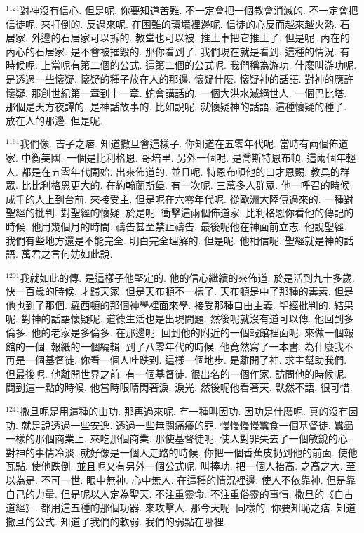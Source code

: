 \documentclass{book}
\begin{document}
$^{1121}$對神沒有信心.
但是呢.
你要知道苦難.
不一定會把一個教會消滅的.
不一定會把信徒呢.
來打倒的.
反過來呢.
在困難的環境裡邊呢.
信徒的心反而越來越火熱.
石居家.
外邊的石居家可以拆的.
教堂也可以被.
推土車把它推土了.
但是呢.
內在的內心的石居家.
是不會被摧毀的.
那你看到了.
我們現在就是看到.
這種的情況.
有時候呢.
上當呢有第二個的公式.
這第二個的公式呢.
我們稱為游功.
什麼叫游功呢.
是透過一些懷疑.
懷疑的種子放在人的那邊.
懷疑什麼.
懷疑神的話語.
對神的應許懷疑.
那創世紀第一章到十一章.
蛇會講話的.
一個大洪水滅絕世人.
一個巴比塔.
那個是天方夜譚的.
是神話故事的.
比如說呢.
就懷疑神的話語.
這種懷疑的種子.
放在人的那邊.
但是呢.

$^{1161}$我們像.
吉子之痞.
知道撒旦會這樣子.
你知道在五零年代呢.
當時有兩個佈道家.
中衡美國.
一個是比利格恩.
哥培里.
另外一個呢.
是喬斯特恩布頓.
這兩個年輕人.
都是在五零年代開始.
出來佈道的.
並且呢.
特恩布頓他的口才恩賜.
教具的群眾.
比比利格恩更大的.
在約翰蘭斯堡.
有一次呢.
三萬多人群眾.
他一呼召的時候.
成千的人上到台前.
來接受主.
但是呢在六零年代呢.
從歐洲大陸傳過來的.
一種對聖經的批判.
對聖經的懷疑.
於是呢.
衝擊這兩個佈道家.
比利格恩你看他的傳記的時候.
他用幾個月的時間.
禱告甚至禁止禱告.
最後呢他在神面前立志.
他說聖經.
我們有些地方還是不能完全.
明白完全理解的.
但是呢.
他相信呢.
聖經就是神的話語.
萬君之言何妨如此說.

$^{1201}$我就如此的傳.
是這樣子他堅定的.
他的信心繼續的來佈道.
於是活到九十多歲.
快一百歲的時候.
才歸天家.
但是天布頓不一樣了.
天布頓是中了那種的毒素.
但是他也到了那個.
羅西頓的那個神學裡面來學.
接受那種自由主義.
聖經批判的.
結果呢.
對神的話語懷疑呢.
道德生活也是出現問題.
然後呢就沒有道可以傳.
他回到多倫多.
他的老家是多倫多.
在那邊呢.
回到他的附近的一個報館裡面呢.
來做一個報館的一個.
報紙的一個編輯.
到了八零年代的時候.
他竟然寫了一本書.
為什麼我不再是一個基督徒.
你看一個人哇跌到.
這樣一個地步.
是離開了神.
求主幫助我們.
但最後呢.
他離開世界之前.
有一個基督徒.
很出名的一個作家.
訪問他的時候呢.
問到這一點的時候.
他當時眼睛閃著淚.
淚光.
然後呢他看著天.
默然不語.
很可惜.

$^{1241}$撒旦呢是用這種的由功.
那再過來呢.
有一種叫因功.
因功是什麼呢.
真的沒有因功.
就是說透過一些安逸.
透過一些無關痛癢的罪.
慢慢慢慢蠶食一個基督徒.
蠶蟲一樣的那個商業上.
來吃那個商業.
那使基督徒呢.
使人對罪失去了一個敏銳的心.
對神的事情冷淡.
就好像是一個人走路的時候.
你把一個香蕉皮扔到他的前面.
使他瓦點.
使他跌倒.
並且呢又有另外一個公式呢.
叫捧功.
把一個人抬高.
之高之大.
至以為是.
不可一世.
眼中無神.
心中無人.
在這種的情況裡邊.
使人不依靠神.
但是靠自己的力量.
但是呢以人定為聖天.
不注重靈命.
不注重俗靈的事情.
撒旦的《自古道經》.
都用這五種的那個功器.
來攻擊人.
那今天呢.
同樣的.
你要知恥之痞.
知道撒旦的公式.
知道了我們的軟弱.
我們的弱點在哪裡.
\end{document}
